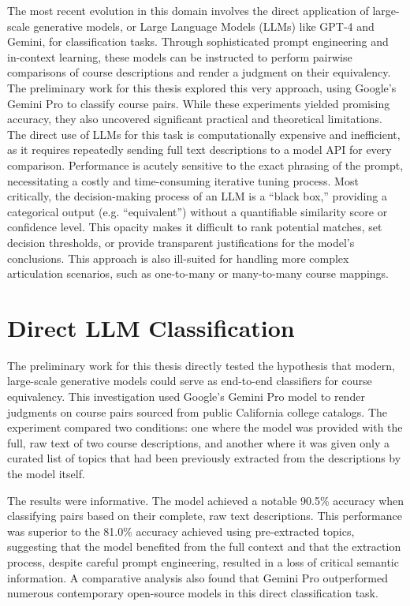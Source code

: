 The most recent evolution in this domain involves the direct application of large-scale generative models, or Large Language Models (LLMs) like GPT-4 and Gemini, for classification tasks. Through sophisticated prompt engineering and in-context learning, these models can be instructed to perform pairwise comparisons of course descriptions and render a judgment on their equivalency. The preliminary work for this thesis explored this very approach, using Google's Gemini Pro to classify course pairs. While these experiments yielded promising accuracy, they also uncovered significant practical and theoretical limitations. The direct use of LLMs for this task is computationally expensive and inefficient, as it requires repeatedly sending full text descriptions to a model API for every comparison. Performance is acutely sensitive to the exact phrasing of the prompt, necessitating a costly and time-consuming iterative tuning process. Most critically, the decision-making process of an LLM is a ``black box,'' providing a categorical output (e.g. ``equivalent'') without a quantifiable similarity score or confidence level. This opacity makes it difficult to rank potential matches, set decision thresholds, or provide transparent justifications for the model's conclusions. This approach is also ill-suited for handling more complex articulation scenarios, such as one-to-many or many-to-many course mappings.

\section{Direct LLM Classification}
The preliminary work for this thesis directly tested the hypothesis that modern, large-scale generative models could serve as end-to-end classifiers for course equivalency. This investigation used Google's Gemini Pro model to render judgments on course pairs sourced from public California college catalogs. The experiment compared two conditions: one where the model was provided with the full, raw text of two course descriptions, and another where it was given only a curated list of topics that had been previously extracted from the descriptions by the model itself.

The results were informative. The model achieved a notable 90.5\% accuracy when classifying pairs based on their complete, raw text descriptions. This performance was superior to the 81.0\% accuracy achieved using pre-extracted topics, suggesting that the model benefited from the full context and that the extraction process, despite careful prompt engineering, resulted in a loss of critical semantic information. A comparative analysis also found that Gemini Pro outperformed numerous contemporary open-source models in this direct classification task.

